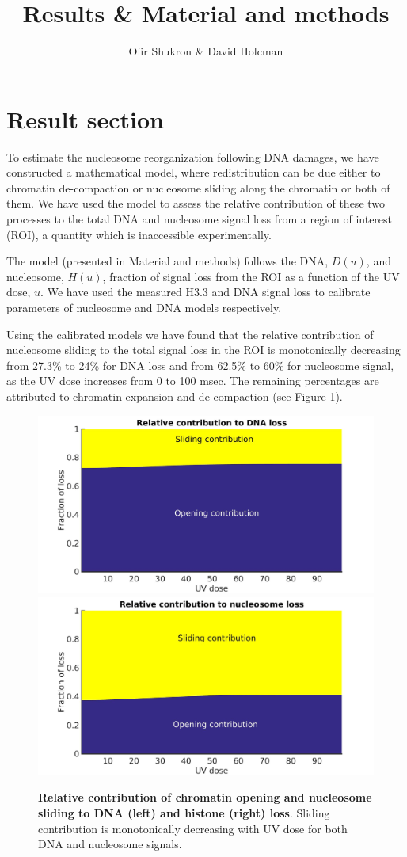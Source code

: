 \documentclass[12pt]{article}
\begin{document}
	
	\title{Results \& Material and methods}
	\author{Ofir Shukron \& David Holcman}
	\maketitle
	
	\section{Result section}
	To estimate the nucleosome reorganization following DNA damages, we have
	constructed a mathematical model, where redistribution can be due either to chromatin de-compaction or nucleosome sliding along the chromatin or both of them. We have used the model to assess the relative contribution of these two processes to the total DNA and nucleosome signal loss from a region of interest (ROI), a quantity which is inaccessible experimentally.
	
	The model (presented in Material and methods) follows the DNA, $D(u)$,
	and nucleosome, $H(u)$, fraction of signal loss from the ROI as a function of
	the UV dose, $u$. We have used the measured H3.3 and DNA signal loss to
	calibrate parameters of nucleosome and DNA models respectively.
	
	Using the calibrated models we have found that the relative contribution
	of nucleosome sliding to the total signal loss in the ROI is monotonically
	decreasing from 27.3\% to 24\% for DNA loss and from 62.5\% to 60\% for nucleosome signal,
	as the UV dose increases from 0 to 100 msec. The remaining percentages are
	attributed to chromatin expansion and de-compaction (see Figure \ref{fig:relatiiveContributionToLoss}).
	
	\begin{figure}[H]
		\includegraphics[width=0.5\linewidth, height=0.3\textheight]{relatiiveContributionToDNALoss}
		\includegraphics[width=0.5\linewidth, height=0.3\textheight]{relativeContributionToHistoneLoss}
		\caption{\textbf{Relative contribution of chromatin opening and nucleosome sliding to DNA (left) and histone (right) loss}. Sliding contribution is monotonically decreasing with UV dose for both DNA and nucleosome signals.}
		\label{fig:relatiiveContributionToLoss}
	\end{figure}
	
\end{document}
